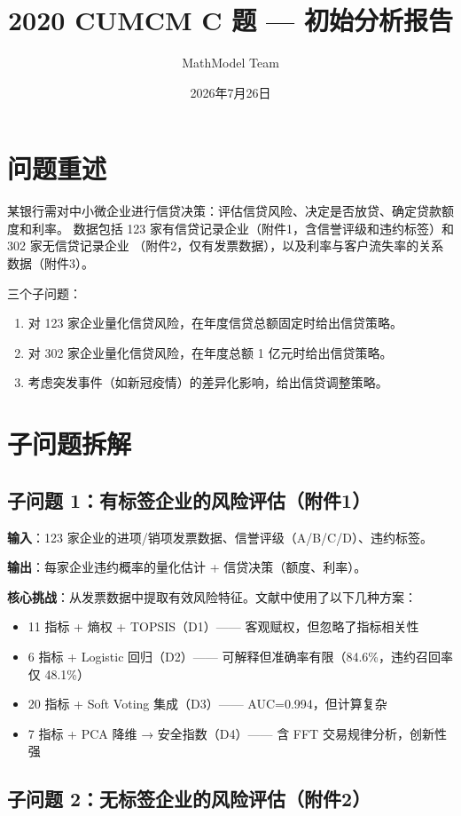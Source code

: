 \documentclass{internal-report}
\title{2020 CUMCM C 题 — 初始分析报告}
\author{MathModel Team}
\date{2026年7月26日}
\begin{document}
\maketitle

\section{问题重述}

某银行需对中小微企业进行信贷决策：评估信贷风险、决定是否放贷、确定贷款额度和利率。
数据包括 123 家有信贷记录企业（附件1，含信誉评级和违约标签）和 302 家无信贷记录企业
（附件2，仅有发票数据），以及利率与客户流失率的关系数据（附件3）。

三个子问题：
\begin{enumerate}
  \item 对 123 家企业量化信贷风险，在年度信贷总额固定时给出信贷策略。
  \item 对 302 家企业量化信贷风险，在年度总额 1 亿元时给出信贷策略。
  \item 考虑突发事件（如新冠疫情）的差异化影响，给出信贷调整策略。
\end{enumerate}

\section{子问题拆解}

\subsection{子问题 1：有标签企业的风险评估（附件1）}

\textbf{输入}：123 家企业的进项/销项发票数据、信誉评级（A/B/C/D）、违约标签。

\textbf{输出}：每家企业违约概率的量化估计 + 信贷决策（额度、利率）。

\textbf{核心挑战}：从发票数据中提取有效风险特征。文献中使用了以下几种方案：
\begin{itemize}
  \item 11 指标 + 熵权 + TOPSIS（D1）—— 客观赋权，但忽略了指标相关性
  \item 6 指标 + Logistic 回归（D2）—— 可解释但准确率有限（84.6\%，违约召回率仅 48.1\%）
  \item 20 指标 + Soft Voting 集成（D3）—— AUC=0.994，但计算复杂
  \item 7 指标 + PCA 降维 → 安全指数（D4）—— 含 FFT 交易规律分析，创新性强
\end{itemize}

\subsection{子问题 2：无标签企业的风险评估（附件2）}
\end{document}
